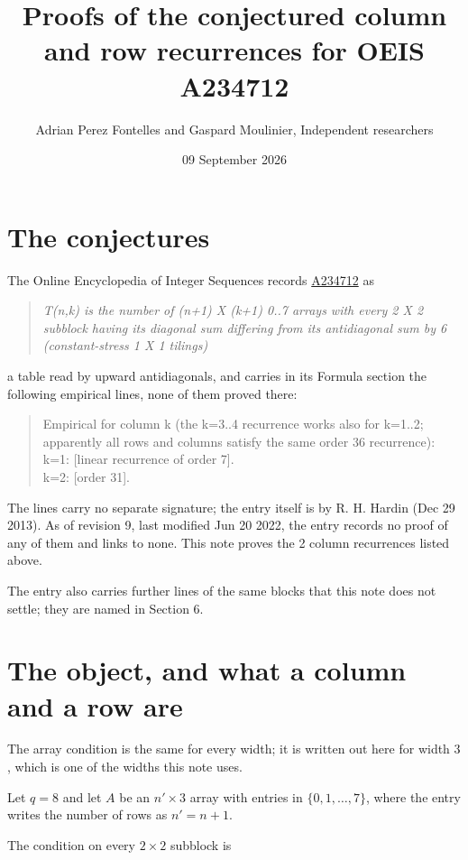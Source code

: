 \documentclass[11pt]{article}
\title{Proofs of the conjectured column and row recurrences for OEIS A234712}
\author{Adrian Perez Fontelles and Gaspard Moulinier, Independent researchers}
\date{09 September 2026}
\theoremstyle{definition}
\begin{document}
\maketitle
\section{The conjectures}

The Online Encyclopedia of Integer Sequences records \href{https://oeis.org/A234712}{A234712} as

\begin{quote}\itshape T(n,k) is the number of (n+1) X (k+1) 0..7 arrays with every 2 X 2 subblock having its diagonal sum differing from its antidiagonal sum by 6 (constant-stress 1 X 1 tilings)\end{quote}

a table read by upward antidiagonals, and carries in its Formula section the following empirical lines, none of them proved there:

\begin{quote}\ttfamily Empirical for column k (the k=3..4 recurrence works also for k=1..2; apparently all rows and columns satisfy the same order 36 recurrence):\\
k=1: [linear recurrence of order 7].\\k=2: [order 31].\end{quote}

The lines carry no separate signature; the entry itself is by R. H. Hardin (Dec 29 2013). As of revision 9, last modified Jun 20 2022, the entry records no proof of any of them and links to none. This note proves the 2 column recurrences listed above.

The entry also carries further lines of the same blocks that this note does not settle; they are named in Section 6.

\section{The object, and what a column and a row are}

The array condition is the same for every width; it is written out here for width $3$, which is one of the widths this note uses.

Let $q = 8$ and let $A$ be an $n' \times 3$ array with entries in $\{0,1,\dots,7\}$, where the entry writes the number of rows as $n' = n + 1$.

The condition on every $2 \times 2$ subblock is
\end{document}
